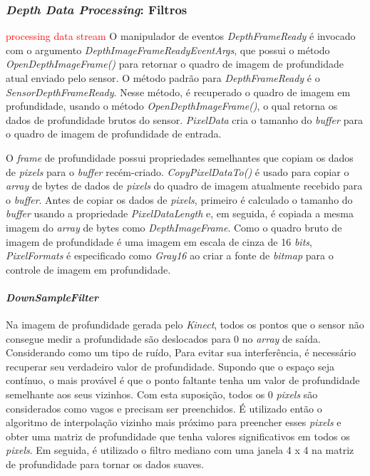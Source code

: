 \subsubsection{\textit{Depth Data Processing}: Filtros}\label{sec:depthDataProcessing}
\textcolor{red}{processing data stream}
O manipulador de eventos \textit{DepthFrameReady} é invocado com o argumento \textit{DepthImageFrameReadyEventArgs}, que possui o método \textit{OpenDepthImageFrame()} para retornar o quadro de imagem de profundidade atual enviado pelo sensor. O  método padrão para \textit{DepthFrameReady} é o \textit{SensorDepthFrameReady}. Nesse método, é recuperado o quadro de imagem em profundidade, usando o método \textit{OpenDepthImageFrame()}, o qual retorna os dados de profundidade brutos do sensor. \textit{PixelData} cria o tamanho do \textit{buffer} para o quadro de imagem de profundidade de entrada.

O \textit{frame} de profundidade possui propriedades semelhantes que copiam os dados de \textit{pixels} para o \textit{buffer} recém-criado. \textit{CopyPixelDataTo()} é usado para copiar o \textit{array} de bytes de dados de \textit{pixels} do quadro de imagem atualmente recebido para o \textit{buffer}. Antes de copiar os dados de \textit{pixels}, primeiro é calculado o tamanho do \textit{buffer} usando a propriedade \textit{PixelDataLength} e, em seguida, é copiada a mesma imagem do \textit{array} de bytes como \textit{DepthImageFrame}. Como o quadro bruto de imagem de profundidade é uma imagem em escala de cinza de 16 \textit{bits}, \textit{PixelFormats} é especificado  como \textit{Gray16} ao criar a fonte de \textit{bitmap} para o controle de imagem em profundidade.

\paragraph{\textit{DownSampleFilter}}\label{sec:DSfilter}
 Na imagem de profundidade gerada pelo \textit{Kinect}, todos os pontos que o sensor não consegue medir a profundidade são deslocados para 0 no \textit{array} de saída. Considerando  como um tipo de ruído, Para evitar sua interferência, é necessário recuperar seu verdadeiro valor de profundidade. Supondo que o espaço seja contínuo, o mais provável é que o ponto faltante tenha um valor de profundidade semelhante aos seus vizinhos. Com esta suposição, todos os 0 \textit{pixels} são considerados como vagos e precisam ser preenchidos. É utilizado então o algoritmo de interpolação vizinho mais próximo para preencher esses \textit{pixels} e obter uma matriz de profundidade que tenha valores significativos em todos os \textit{pixels}. Em seguida, é utilizado o filtro mediano com uma janela 4 x 4 na matriz de profundidade para tornar os dados suaves.

